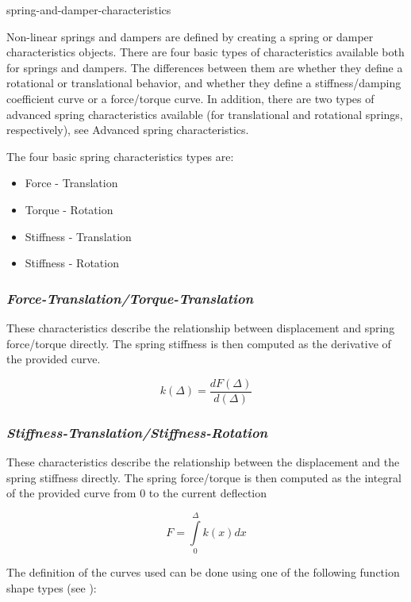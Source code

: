 {spring-and-damper-characteristics}

Non-linear springs and dampers are defined by creating a spring or
damper characteristics objects. There are four basic types of
characteristics available both for springs and dampers. The differences
between them are whether they define a rotational or translational
behavior, and whether they define a stiffness/damping coefficient curve
or a force/torque curve. In addition, there are two types of advanced
spring characteristics available (for translational and rotational
springs, respectively), see 
{Advanced spring characteristics}.


The four basic spring characteristics types are:

\begin{itemize} \setlength\itemsep{0.2em}
\item Force - Translation
\item Torque - Rotation
\item Stiffness - Translation
\item Stiffness - Rotation
\end{itemize}

\subsubsection{\sl\textbf{Force-Translation/Torque-Translation}}

These characteristics describe the relationship between displacement
and spring force/torque directly. The spring stiffness is then computed as
the derivative of the provided curve.

$$
  k(\Delta) = \frac{dF(\Delta)}{d(\Delta)}
$$

\subsubsection{\sl\textbf{Stiffness-Translation/Stiffness-Rotation}}

These characteristics describe the relationship between the displacement
and the spring stiffness directly. The spring force/torque is then computed as
the integral of the provided curve from 0 to the current deflection

$$
  F = \int\limits_0^\Delta k(x) dx
$$

The definition of the curves used can be done using one of the following
function shape types (see ):

